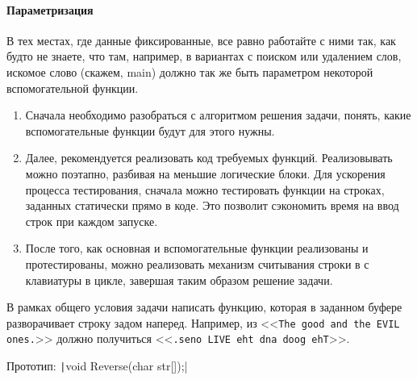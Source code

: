 \paragraph{Параметризация}
В тех местах, где данные фиксированные, все равно работайте с ними так, как будто не знаете, что там, например, в вариантах с поиском или удалением слов, искомое слово (скажем, main) должно так же быть параметром некоторой вспомогательной функции.
\begin{comment}
\begin{itemize}
    \item Тут нужно напомнить, что у нас называется строкой, что это просто массив символов, а то и просто чисел-кодов с нулем на конце
    \item Можно еще побеседовать про разбиение на подзадачи. Подсказать, на какие логично фунции разбивать программу. Например, поиск слов если нужен и тп.
    \item Про вспомогательные функции - вычисление длины строки isalnum и тп.
\end{itemize}
\end{comment}


\zzsectionPLAN
\begin{enumerate}
	\item Сначала необходимо разобраться с алгоритмом решения задачи, понять, какие вспомогательные функции будут для этого нужны.
	\item Далее, рекомендуется реализовать код требуемых функций. Реализовывать можно поэтапно, разбивая на меньшие логические блоки. Для ускорения процесса тестирования, сначала можно тестировать функции на строках, заданных статически прямо в коде. Это позволит сэкономить время на ввод строк при каждом запуске.
	\item После того, как основная и вспомогательные функции реализованы и протестированы, можно реализовать механизм считывания строки в с клавиатуры в цикле, завершая таким образом решение задачи.
\end{enumerate}


\zzsectionVARIATIONS


\begin{zztask}
В рамках общего условия задачи написать функцию, которая в заданном буфере
разворачивает строку задом наперед.
Например, из
<<\texttt{The good and the EVIL ones.}>>
должно получиться
<<\texttt{.seno LIVE eht dna doog ehT}>>.

Прототип: \texttt|void Reverse(char str[]);|
\end{zztask}


